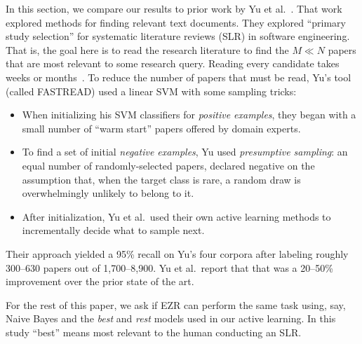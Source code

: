 \documentclass[AMA,STIX2COL]{WileyNJDv5}
\newcommand{\NEW}[1]{\textcolor{newblue}{#1}}
\begin{document}
In this section, we compare our results to prior work 
by
Yu et al.~\cite{yu2018total}.
That work
explored methods for 
finding relevant text documents.
They explored
``primary study selection'' for
systematic literature reviews (SLR)
in software engineering. 
That is, the goal here is 
to read
the research literature
to find the $M\ll N$
papers that are most relevant
to some research query.
 Reading
every candidate takes weeks or months~\cite{yu2017feature,yu2018finding}. 
To reduce the number of papers that must be read, Yu's tool 
(called FASTREAD) used a linear SVM with
some sampling tricks:
\begin{itemize}
\item 
When initializing his SVM classifiers for {\em positive examples},
they began with a small number of ``warm start'' papers offered by domain experts. 

\item To
find a set of initial {\em negative examples}, Yu used {\em presumptive sampling}:
  an equal number of randomly-selected papers, declared negative on
  the assumption that, when the target class is rare, a random draw
  is overwhelmingly unlikely to belong to it.
  \item After initialization, Yu et al.\ used their own active learning
  methods to incrementally decide what to sample next.
\end{itemize}
Their approach yielded a 95\% recall on Yu's four corpora after labeling
roughly \NEW{300--630} papers out of 1,700--8,900. 
Yu et al.\ report that that was a
20--50\% improvement over the prior state of the
art.

For the rest of this paper,  we  ask if EZR can perform the same task using, say,
Naive Bayes and the {\em best} and {\em rest} models
used in our active learning.  
In this study ``best'' means most relevant to the human conducting an SLR.
\end{document}
